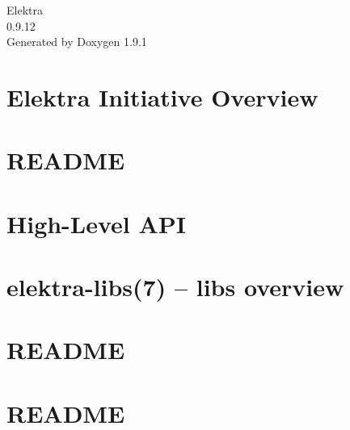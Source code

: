 \let\mypdfximage\pdfximage\def\pdfximage{\immediate\mypdfximage}\documentclass[twoside]{book}
\newcommand{\+}{\discretionary{\mbox{\scriptsize$\hookleftarrow$}}{}{}}
\newcommand{\clearemptydoublepage}{%
  \newpage{\pagestyle{empty}\cleardoublepage}%
}
\begin{document}
\raggedbottom

\hypersetup{pageanchor=false,
             bookmarksnumbered=true,
             pdfencoding=unicode
            }
\begin{titlepage}
\vspace*{7cm}
\begin{center}%
{\Large Elektra \\[1ex]\large 0.\+9.\+12 }\\
\vspace*{1cm}
{\large Generated by Doxygen 1.9.1}\\
\end{center}
\end{titlepage}
\clearemptydoublepage
{}
\tableofcontents
\clearemptydoublepage
{}
\hypersetup{pageanchor=true}

\chapter{Elektra Initiative Overview}
\label{index}\hypertarget{index}{}
\chapter{README}
\label{md_src_libs_elektra_README}

\chapter{High-\/\+Level API}
\label{src_libs_highlevel_README_md}

\chapter{elektra-\/libs(7) -- libs overview}
\label{src_libs_README_md}

\chapter{README}
\label{md_src_libs_template_README}

\chapter{README}
\label{md_src_bindings_io_doc_README}

\end{document}
